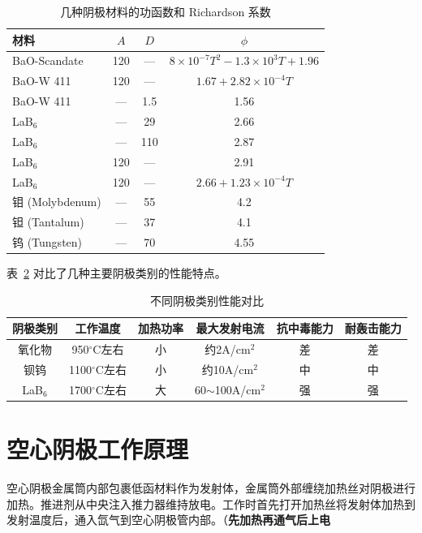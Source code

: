   \begin{table}[htbp]
    \centering
    \caption{几种阴极材料的功函数和 Richardson 系数}
    \label{tab:cathode_materials}
    \begin{tabular}{lccc}
      \toprule
      材料 & $A$ & $D$ & $\phi$ \\
      \midrule
      BaO-Scandate & 120 & --- & $8 \times 10^{-7} T^2 - 1.3 \times 10^3 T + 1.96$ \\
      BaO-W 411 & 120 & --- & $1.67 + 2.82 \times 10^{-4} T$ \\
      BaO-W 411 & --- & 1.5 & 1.56 \\
      LaB$_6$ & --- & 29 & 2.66 \\
      LaB$_6$ & --- & 110 & 2.87 \\
      LaB$_6$ & 120 & --- & 2.91 \\
      LaB$_6$ & 120 & --- & $2.66 + 1.23 \times 10^{-4} T$ \\
      钼 (Molybdenum) & --- & 55 & 4.2 \\
      钽 (Tantalum) & --- & 37 & 4.1 \\
      钨 (Tungsten) & --- & 70 & 4.55 \\
      \bottomrule
    \end{tabular}
  \end{table}

  表~\ref{tab:cathode_comparison} 对比了几种主要阴极类别的性能特点。

  \begin{table}[htbp]
    \centering
    \caption{不同阴极类别性能对比}
    \label{tab:cathode_comparison}
    \begin{tabular}{cccccc}
      \toprule
      阴极类别 & 工作温度 & 加热功率 & 最大发射电流 & 抗中毒能力 & 耐轰击能力 \\
      \midrule
      氧化物 & 950$^\circ$C左右 & 小 & 约2A/cm$^2$ & 差 & 差 \\
      钡钨 & 1100$^\circ$C左右 & 小 & 约10A/cm$^2$ & 中 & 中 \\
      LaB$_6$ & 1700$^\circ$C左右 & 大 & 60$\sim$100A/cm$^2$ & 强 & 强 \\
      \bottomrule
    \end{tabular}
  \end{table}

  
\section{空心阴极工作原理}

  空心阴极金属筒内部包裹低函材料作为发射体，金属筒外部缠绕加热丝对阴极进行加热。推进剂从中央注入推力器维持放电。工作时首先打开加热丝将发射体加热到发射温度后，通入氙气到空心阴极管内部。（\textbf{先加热再通气后上电}

